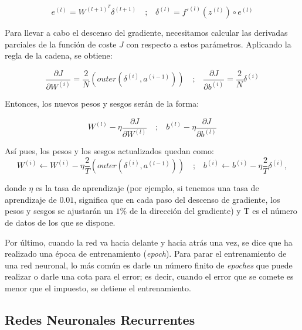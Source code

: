 \documentclass[12pt,twoside]{article}
\begin{document}
\begin{equation}
e^{(l)} = W^{(l+1)^T} \delta^{(l+1)}
\quad \text{;} \quad
\delta^{(l)} = f'^{(l)}(z^{(l)}) \circ e^{(l)}
\end{equation}

Para llevar a cabo el descenso del gradiente, necesitamos calcular las derivadas parciales de la función de coste $J$ con respecto a estos parámetros. Aplicando la regla de la cadena, se obtiene: 

\begin{equation}
\frac{\partial J}{\partial W^{(i)}} = \frac{2}{N}\left(outer(\delta^{(i)}, a^{(i-1)})\right)
\quad \text{;} \quad
\frac{\partial J}{\partial b^{(i)}} = \frac{2}{N} \delta^{(i)}
\end{equation}

Entonces, los nuevos pesos y sesgos serán de la forma:

\begin{equation}
W^{(l)} - \eta\frac{\partial J}{\partial W^{(l)}}
\quad \text{;} \quad
b^{(l)} - \eta \frac{\partial J}{\partial b^{(l)}}
\end{equation}


Así pues, los pesos y los sesgos actualizados quedan como:
\begin{equation}
W^{(i)} \leftarrow W^{(i)} - \eta \frac{2}{T}\left(outer(\delta^{(i)}, a^{(i-1)})\right)
\quad \text{;} \quad
b^{(i)} \leftarrow b^{(i)} - \eta\frac{2}{T} \delta^{(i)}, 
\end{equation}

donde $\eta$ es la tasa de aprendizaje (por ejemplo, si tenemos una tasa de aprendizaje de $0.01$, significa que en cada paso del descenso de gradiente, los pesos y sesgos se ajustarán un $1 \%$ de la dirección del gradiente) y T es el número de datos de los que se dispone.

Por último, cuando la red va hacia delante y hacia atrás una vez, se dice que ha realizado una época de entrenamiento (\textit{epoch}). Para parar el entrenamiento de una red neuronal, lo más común es darle un número finito de \textit{epoches} que puede realizar o darle una cota para el error; es decir, cuando el error que se comete es menor que el impuesto, se detiene el entrenamiento.



\subsection{Redes Neuronales Recurrentes}\label{sec:14}
\end{document}
